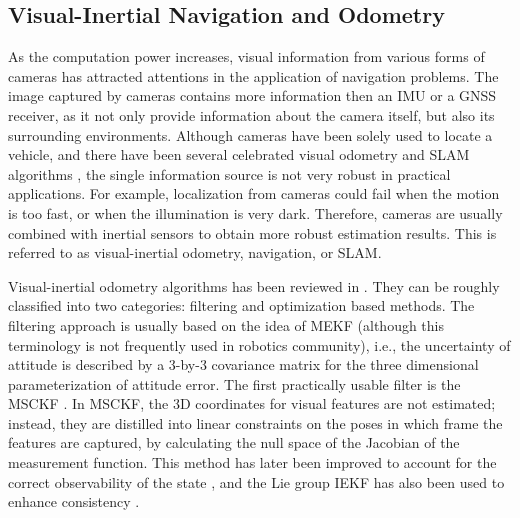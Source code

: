 \subsection{Visual-Inertial Navigation and Odometry} \label{section:intro-review-VIO}

As the computation power increases, visual information from various forms of cameras has attracted attentions in the application of navigation problems.
The image captured by cameras contains more information then an IMU or a GNSS receiver, as it not only provide information about the camera itself, but also its surrounding environments.
Although cameras have been solely used \cite{scaramuzza2011visual} to locate a vehicle, and there have been several celebrated visual odometry and SLAM algorithms \cite{forster2014svo,klein2007parallel,mur2015orb}, the single information source is not very robust in practical applications.
For example, localization from cameras could fail when the motion is too fast, or when the illumination is very dark.
Therefore, cameras are usually combined with inertial sensors to obtain more robust estimation results.
This is referred to as visual-inertial odometry, navigation, or SLAM.

Visual-inertial odometry algorithms has been reviewed in \cite{huang2019visual}.
They can be roughly classified into two categories: filtering and optimization based methods.
The filtering approach is usually based on the idea of MEKF (although this terminology is not frequently used in robotics community), i.e., the uncertainty of attitude is described by a 3-by-3 covariance matrix for the three dimensional parameterization of attitude error.
The first practically usable filter is the MSCKF \cite{mourikis2007multi}.
In MSCKF, the 3D coordinates for visual features are not estimated; instead, they are distilled into linear constraints on the poses in which frame the features are captured, by calculating the null space of the Jacobian of the measurement function.
This method has later been improved to account for the correct observability of the state \cite{hesch2013consistency,li2012improving,li2013high}, and the Lie group IEKF has also been used to enhance consistency \cite{brossard2018invariant}.

